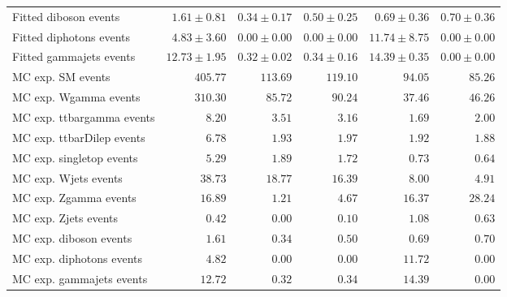\begin{table}
\begin{center}
{\begin{tabular*}{\textwidth}{@{\extracolsep{\fill}}lrrrrr}
        Fitted diboson events         & $1.61 \pm 0.81$          & $0.34 \pm 0.17$          & $0.50 \pm 0.25$          & $0.69 \pm 0.36$          & $0.70 \pm 0.36$              \\
        Fitted diphotons events         & $4.83 \pm 3.60$          & $0.00 \pm 0.00$          & $0.00 \pm 0.00$          & $11.74 \pm 8.75$          & $0.00 \pm 0.00$              \\
        Fitted gammajets events         & $12.73 \pm 1.95$          & $0.32 \pm 0.02$          & $0.34 \pm 0.16$          & $14.39 \pm 0.35$          & $0.00 \pm 0.00$              \\
 \noalign{\smallskip}\hline\noalign{\smallskip}
MC exp. SM events              & $405.77$          & $113.69$          & $119.10$          & $94.05$          & $85.26$              \\
\noalign{\smallskip}\hline\noalign{\smallskip}
        MC exp. Wgamma events         & $310.30$          & $85.72$          & $90.24$          & $37.46$          & $46.26$              \\
        MC exp. ttbargamma events         & $8.20$          & $3.51$          & $3.16$          & $1.69$          & $2.00$              \\
        MC exp. ttbarDilep events         & $6.78$          & $1.93$          & $1.97$          & $1.92$          & $1.88$              \\
        MC exp. singletop events         & $5.29$          & $1.89$          & $1.72$          & $0.73$          & $0.64$              \\
        MC exp. Wjets events         & $38.73$          & $18.77$          & $16.39$          & $8.00$          & $4.91$              \\
        MC exp. Zgamma events         & $16.89$          & $1.21$          & $4.67$          & $16.37$          & $28.24$              \\
        MC exp. Zjets events         & $0.42$          & $0.00$          & $0.10$          & $1.08$          & $0.63$              \\
        MC exp. diboson events         & $1.61$          & $0.34$          & $0.50$          & $0.69$          & $0.70$              \\
        MC exp. diphotons events         & $4.82$          & $0.00$          & $0.00$          & $11.72$          & $0.00$              \\
        MC exp. gammajets events         & $12.72$          & $0.32$          & $0.34$          & $14.39$          & $0.00$              \\

\end{tabular*}}
\end{center}
\end{table}
